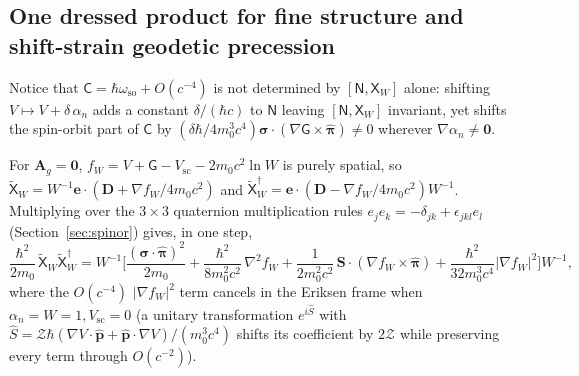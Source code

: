 \documentclass[aps,prd,onecolumn,tightenlines,nofootinbib,notitlepage,10pt,floatfix]{revtex4-2}
\theoremstyle{indentedtheorem}
\begin{document}
\subsection{One dressed product for fine structure and shift-strain geodetic precession}
\label{sec:dressed_table_moyal}

Notice that $\mathsf{C}=\hbar\omega_\text{so}+O(c^{-4})$ is not determined by $[\mathsf{N},\mathsf{X}_W]$ alone: shifting $V\mapsto V+\delta\,\alpha_n$ adds a constant $\delta/(\hbar c)$ to $\mathsf{N}$ leaving $[\mathsf{N},\mathsf{X}_W]$ invariant, yet shifts the spin-orbit part of $\mathsf{C}$ by $(\delta\hbar/4m_0^3 c^4)\boldsymbol{\sigma}\cdot(\nabla\mathsf{G}\times\hat{\boldsymbol{\pi}})\neq 0$ wherever $\nabla\alpha_n\neq\mathbf{0}$.

For $\mathbf{A}_g=\mathbf{0}$, $f_W=V+\mathsf{G}-V_\text{sc}-2m_0 c^2\ln W$ is purely spatial, so $\tilde{\mathsf{X}}_W=W^{-1}\mathbf{e}\cdot(\mathbf{D}+\nabla f_W/4m_0 c^2)$ and $\tilde{\mathsf{X}}_W^\dagger=\mathbf{e}\cdot(\mathbf{D}-\nabla f_W/4m_0 c^2)W^{-1}$. Multiplying over the $3\times 3$ quaternion multiplication rules $e_j e_k=-\delta_{jk}+\epsilon_{jkl}e_l$ (Section~\ref{sec:spinor}) gives, in one step,
\begin{equation}
    \frac{\hbar^2}{2m_0}\,\tilde{\mathsf{X}}_W\tilde{\mathsf{X}}_W^\dagger = W^{-1}\!\bigg[\frac{(\boldsymbol{\sigma}\cdot\hat{\boldsymbol{\pi}})^2}{2m_0} + \frac{\hbar^2}{8m_0^2 c^2}\,\nabla^2 f_W + \frac{1}{2m_0^2 c^2}\,\mathbf{S}\cdot(\nabla f_W\times\hat{\boldsymbol{\pi}}) + \frac{\hbar^2}{32m_0^3 c^4}|\nabla f_W|^2\bigg]W^{-1} ,
    \label{eq:dressed_square_W}
\end{equation}
where the $O(c^{-4})$ $|\nabla f_W|^2$ term cancels in the Eriksen frame when $\alpha_n=W=1, V_\text{sc}=0$ (a unitary transformation $e^{i\hat{S}}$ with $\hat{S}=\mathcal{Z}\hbar(\nabla V\cdot\hat{\mathbf{p}}+\hat{\mathbf{p}}\cdot\nabla V)/(m_0^3 c^4)$ shifts its coefficient by $2\mathcal{Z}$ while preserving every term through $O(c^{-2})$).
\end{document}
